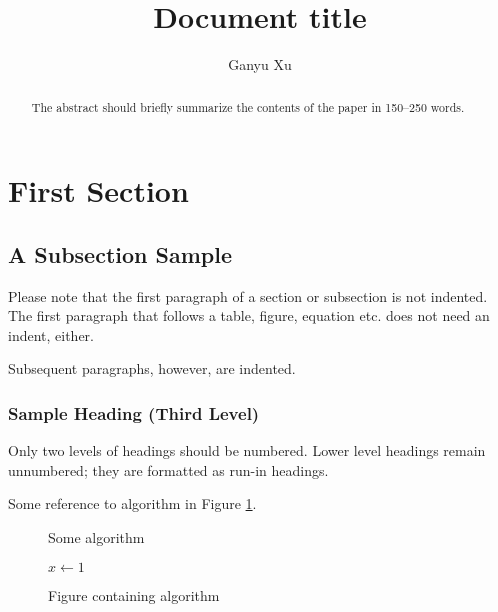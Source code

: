 \documentclass[runningheads]{llncs}
\begin{document}
\title{Document title}


\author{
    Ganyu Xu
}
%


\maketitle 

\begin{abstract}
    The abstract should briefly summarize the contents of the paper in
    150--250 words.

\end{abstract}

\section{First Section}
\subsection{A Subsection Sample}
Please note that the first paragraph of a section or subsection is
not indented. The first paragraph that follows a table, figure,
equation etc. does not need an indent, either.

Subsequent paragraphs, however, are indented.

\subsubsection{Sample Heading (Third Level)} Only two levels of
headings should be numbered. Lower level headings remain unnumbered;
they are formatted as run-in headings.

Some reference to algorithm in Figure \ref{fig:some-algorithm}.

\begin{figure}[H]
    \centering
    \begin{minipage}[t]{0.5\textwidth}
    \begin{algorithm}[H]
        \caption{Some algorithm}
        \begin{algorithmic}[1]
            \State $x \leftarrow 1$
        \end{algorithmic}
    \end{algorithm}
    \end{minipage}
    \caption{Figure containing algorithm}\label{fig:some-algorithm}
\end{figure}
\end{document}
